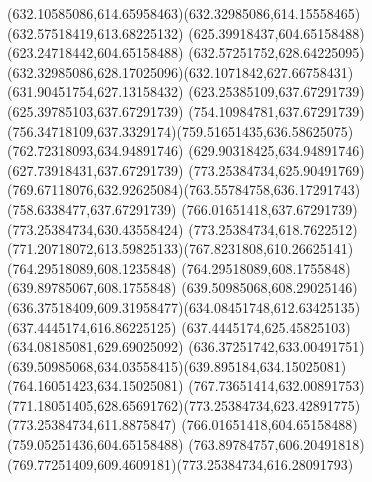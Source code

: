 {{\curveto(632.10585086,614.65958463)(632.32985086,614.15558465)(632.57518419,613.68225132)
\lineto(625.39918437,604.65158488)
\lineto(623.24718442,604.65158488)
\closepath
\moveto(632.57251752,628.64225095)
\curveto(632.32985086,628.17025096)(632.1071842,627.66758431)(631.90451754,627.13158432)
\lineto(623.25385109,637.67291739)
\lineto(625.39785103,637.67291739)
\closepath
\moveto(754.10984781,637.67291739)
\curveto(756.34718109,637.3329174)(759.51651435,636.58625075)(762.72318093,634.94891746)
\lineto(629.90318425,634.94891746)
\lineto(627.73918431,637.67291739)
\closepath
\moveto(773.25384734,625.90491769)
\curveto(769.67118076,632.92625084)(763.55784758,636.17291743)(758.6338477,637.67291739)
\lineto(766.01651418,637.67291739)
\lineto(773.25384734,630.43558424)
\closepath
\moveto(773.25384734,618.7622512)
\curveto(771.20718072,613.59825133)(767.8231808,610.26625141)(764.29518089,608.1235848)
\lineto(764.29518089,608.1755848)
\lineto(639.89785067,608.1755848)
\curveto(639.50985068,608.29025146)(636.37518409,609.31958477)(634.08451748,612.63425135)
\lineto(637.4445174,616.86225125)
\lineto(637.4445174,625.45825103)
\lineto(634.08185081,629.69025092)
\curveto(636.37251742,633.00491751)(639.50985068,634.03558415)(639.895184,634.15025081)
\lineto(764.16051423,634.15025081)
\curveto(767.73651414,632.00891753)(771.18051405,628.65691762)(773.25384734,623.42891775)
\closepath
\moveto(773.25384734,611.8875847)
\lineto(766.01651418,604.65158488)
\lineto(759.05251436,604.65158488)
\curveto(763.89784757,606.20491818)(769.77251409,609.4609181)(773.25384734,616.28091793)
\closepath
}
}
{
}
{
}
